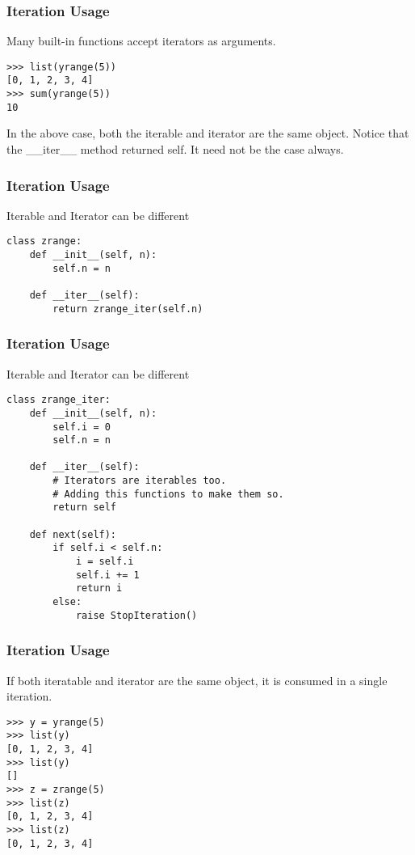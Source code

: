 \begin{frame}[fragile]\frametitle{Iteration Usage}
Many built-in functions accept iterators as arguments.
\begin{lstlisting}
>>> list(yrange(5))
[0, 1, 2, 3, 4]
>>> sum(yrange(5))
10
\end{lstlisting}
In the above case, both the iterable and iterator are the same object. Notice that the \_\_iter\_\_ method returned self. It need not be the case always.
\end{frame}

\begin{frame}[fragile]\frametitle{Iteration Usage}
Iterable and Iterator can be different
\begin{lstlisting}
class zrange:
    def __init__(self, n):
        self.n = n

    def __iter__(self):
        return zrange_iter(self.n)

\end{lstlisting}
\end{frame}

\begin{frame}[fragile]\frametitle{Iteration Usage}
Iterable and Iterator can be different
\begin{lstlisting}
class zrange_iter:
    def __init__(self, n):
        self.i = 0
        self.n = n

    def __iter__(self):
        # Iterators are iterables too.
        # Adding this functions to make them so.
        return self

    def next(self):
        if self.i < self.n:
            i = self.i
            self.i += 1
            return i
        else:
            raise StopIteration()
\end{lstlisting}
\end{frame}


\begin{frame}[fragile]\frametitle{Iteration Usage}
If both iteratable and iterator are the same object, it is consumed in a single iteration.
\begin{lstlisting}
>>> y = yrange(5)
>>> list(y)
[0, 1, 2, 3, 4]
>>> list(y)
[]
>>> z = zrange(5)
>>> list(z)
[0, 1, 2, 3, 4]
>>> list(z)
[0, 1, 2, 3, 4]
\end{lstlisting}
\end{frame}



